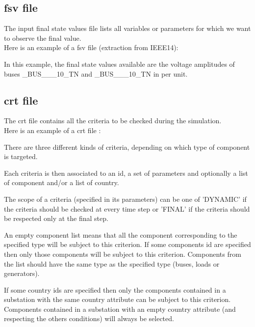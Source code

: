 \documentclass[a4paper, 12pt]{report}
\begin{document}
\subsection{fsv file}

The input final state values file lists all variables or parameters for which we want to observe the final value. \\

Here is an example of a fsv file (extraction from IEEE14):


In this example, the final state values available are the voltage amplitudes of buses \_BUS\_\_\_10\_TN and \_BUS\_\_\_10\_TN in per unit.

\subsection{crt file}
\label{DynawoInputFiles_inputs_crt}

The crt file contains all the criteria to be checked during the
simulation.
\\

Here is an example of a crt file :


There are three different kinds of criteria, depending on which type of
component is targeted.

Each criteria is then associated to an id, a set of parameters and optionally a
list of component and/or a list of country.

The scope of a criteria (specified in its parameters) can be one of 'DYNAMIC' if
the criteria should be checked at every time step or 'FINAL' if the criteria
should be respected only at the final step.

An empty component list means that all the component corresponding to the specified type will be subject to this
criterion. If some components id are specified then only those components will
be subject to this criterion. Components from the list should have the same type as the
specified type (buses, loads or generators).

If some country ids are specified then only the components contained in a
substation with the same country attribute can be subject to this
criterion. Components contained in a substation with an empty country attribute
(and respecting the others conditions) will always be selected.
\end{document}
